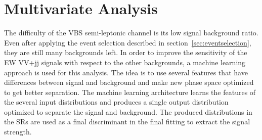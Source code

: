 \section{Multivariate Analysis}
\label{sec:MVA}
The difficulty of the VBS semi-leptonic channel is its low signal background ratio. 
Even after applying the event selection described in section~\ref{sec:eventselection}, they are still many backgrounds left. 
In order to improve the sensitivity of the EW VV+jj signals with respect to the other backgrounds, a machine learning approach is used for this analysis.
The idea is to use several features that have differences between signal and background and make new phase space optimized to get better separation. 
The machine learning architecture learns the features of the several input distributions and produces a single output distribution optimized to separate the signal and background.
The produced distributions in the SRs are used as a final discriminant in the final fitting to extract the signal strength.

